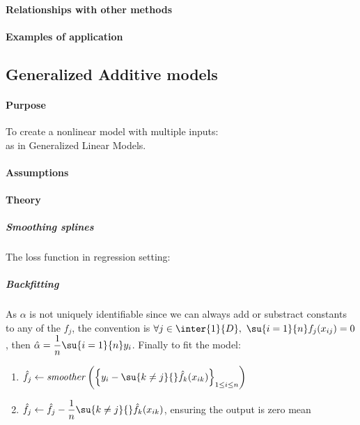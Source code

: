 \paragraph{Relationships with other methods}
\paragraph{Examples of application}

\subsection{Generalized Additive models}
\paragraph{Purpose}
To create a nonlinear model with multiple inputs: \\
 as in Generalized 
Linear Models.
\paragraph{Assumptions}
\paragraph{Theory}
\subparagraph{Smoothing splines}
The loss function in regression setting:
\begin{center}
\end{center}
\subparagraph{Backfitting}
As $\alpha$ is not uniquely identifiable since we can always add or substract constants to any of 
the $f_{j}$, the convention is $\forall j\in\inter{1}{D},~\su{i=1}{n}f_{j}(x_{ij})=0$, then
$\hat{\alpha} = \dfrac{1}{n}\su{i=1}{n}y_{i}$.
Finally to fit the model:
\begin{enumerate}
    \item $\hat{f}_{j} \leftarrow \text{\emph{smoother}}\left(\left\{y_{i} - \su{k\neq j}{}\hat{f}_{
                k}(x_{ik})\right\}_{1\leq i\leq n}\right)$
        \item $\hat{f}_{j} \leftarrow \hat{f}_{j}- \dfrac{1}{n}\su{k\neq j}{}\hat{f}_{k}(x_{ik})$,
            ensuring the output is zero mean
\end{enumerate}


